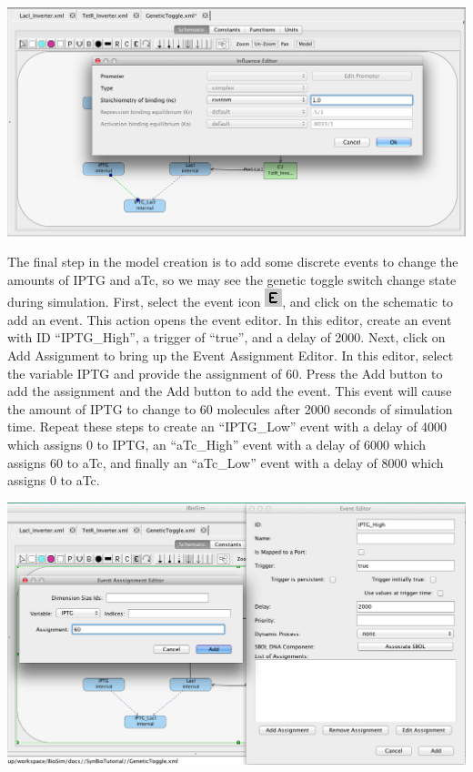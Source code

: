 \documentclass[titlepage,11pt]{article}
\begin{document}
\begin{center}
\includegraphics[width=160mm]{screenshots/complexGT}
\end{center}

The final step in the model creation is to add some discrete events to change the amounts of IPTG and aTc, so we may see the genetic toggle switch change state during simulation.  First, select the event icon \includegraphics{../gui/icons/modelview/event_mode_selected}, and click on the schematic to add an event.  This action opens the event editor.  In this editor, create an event with ID ``IPTG\_High'', a trigger of ``true'', and a delay of 2000.  Next, click on Add Assignment to bring up the Event Assignment Editor.  In this editor, select the variable IPTG and provide the assignment of 60.  Press the Add button to add the assignment and the Add button to add the event.  This event will cause the amount of IPTG to change to 60 molecules after 2000 seconds of simulation time.  Repeat these steps to create an ``IPTG\_Low'' event with a delay of 4000 which assigns 0 to IPTG, an ``aTc\_High'' event with a delay of 6000 which assigns 60 to aTc, and finally an ``aTc\_Low'' event with a delay of 8000 which assigns 0 to aTc.

\begin{center}
\includegraphics[width=160mm]{screenshots/eventGT}
\end{center}
\end{document}
